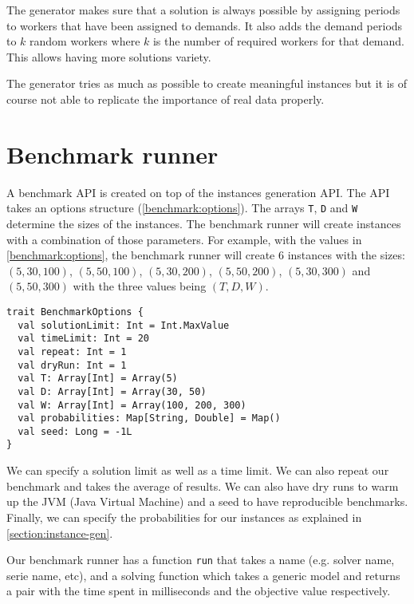 \documentclass[../thesis.tex]{subfiles}
\begin{document}
The generator makes sure that a solution is always possible by assigning periods to workers 
that have been assigned to demands. It also adds the demand periods to $k$ random workers
where $k$ is the number of required workers for that demand. This allows having more solutions variety.
    
The generator tries as much as possible to create meaningful instances but it is of course not able to replicate the importance of real data properly.

\section{Benchmark runner}
\label{section:benchmark-runner}

A benchmark API is created on top of the instances generation API. The API takes an options structure (\autoref{benchmark:options}).
The arrays \texttt{T}, \texttt{D} and \texttt{W} determine the sizes of the instances. The benchmark runner 
will create instances with a combination of those parameters. For example, with the values in \autoref{benchmark:options},
the benchmark runner will create 6 instances with the sizes: $(5, 30, 100)$, $(5, 50, 100)$, $(5, 30, 200)$, $(5, 50, 200)$, $(5, 30, 300)$ and $(5, 50, 300)$ with the 
three values being $(T, D, W)$.

\begin{lstlisting}[style=scalaStyle,label={benchmark:options},caption={Benchmark options},captionpos=b]
trait BenchmarkOptions {
  val solutionLimit: Int = Int.MaxValue
  val timeLimit: Int = 20
  val repeat: Int = 1
  val dryRun: Int = 1
  val T: Array[Int] = Array(5)
  val D: Array[Int] = Array(30, 50)
  val W: Array[Int] = Array(100, 200, 300)
  val probabilities: Map[String, Double] = Map()
  val seed: Long = -1L
}
\end{lstlisting}

We can specify a solution limit as well as a time limit. We can also repeat our benchmark and takes 
the average of results. We can also have dry runs to warm up the JVM (Java Virtual Machine) and a seed to have reproducible benchmarks. Finally,
we can specify the probabilities for our instances as explained in \autoref{section:instance-gen}.

Our benchmark runner has a function \texttt{run} that takes a name (e.g. solver name, serie name, etc), and a solving function 
which takes a generic model and returns a pair with the time spent in milliseconds and the objective value respectively.
\end{document}

